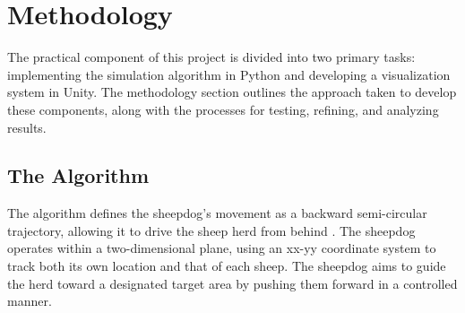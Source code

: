 \documentclass[9pt]{pnas-new}
\begin{document}

\section*{Methodology}

The practical component of this project is divided into two primary tasks: implementing the simulation algorithm in Python and developing a visualization system in Unity. The methodology section outlines the approach taken to develop these components, along with the processes for testing, refining, and analyzing results.

\subsection*{The Algorithm}
The algorithm defines the sheepdog’s movement as a backward semi-circular trajectory, allowing it to drive the sheep herd from behind \cite{liu2021}. The sheepdog operates within a two-dimensional plane, using an xx-yy coordinate system to track both its own location and that of each sheep. The sheepdog aims to guide the herd toward a designated target area by pushing them forward in a controlled manner.
\end{document}
